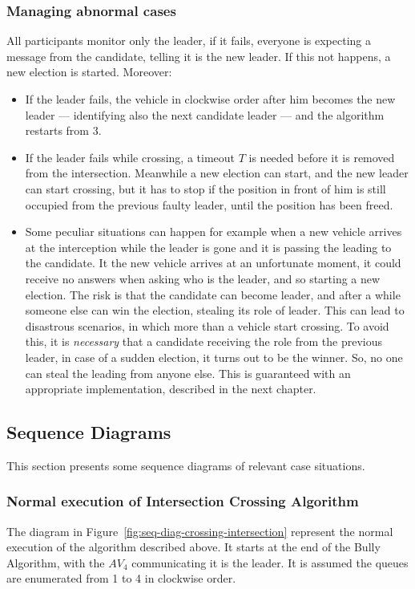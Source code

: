 \documentclass{memoir}
\begin{document}
\subsubsection{Managing abnormal cases}\label{subsec:abnormal-cases}

All participants monitor only the leader, if it fails, everyone is expecting a message from the candidate, telling it is the new leader. If this not happens, a new election is started. Moreover:

\begin{itemize}
	\item If the leader fails, the vehicle in clockwise order after him becomes the new leader --- identifying also the next candidate leader --- and the algorithm restarts from 3.
	\item If the leader fails while crossing, a timeout $T$ is needed before it is removed from the intersection. Meanwhile a new election can start, and the new leader can start crossing, but it has to stop if the position in front of him is still occupied from the previous faulty leader, until the position has been freed.
	\item Some peculiar situations can happen for example when a new vehicle arrives at the interception while the leader is gone and it is passing the leading to the candidate. It the new vehicle arrives at an unfortunate moment, it could receive no answers when asking who is the leader, and so starting a new election. The risk is that the candidate can become leader, and after a while someone else can win the election, stealing its role of leader. This can lead to disastrous scenarios, in which more than a vehicle start crossing. To avoid this, it is \emph{necessary} that a candidate receiving the role from the previous leader, in case of a sudden election, it turns out to be the winner. So, no one can steal the leading from anyone else. This is guaranteed with an appropriate implementation, described in the next chapter.
\end{itemize}

\subsection{Sequence Diagrams}
This section presents some sequence diagrams of relevant case situations.

\subsubsection{Normal execution of Intersection Crossing Algorithm}
The diagram in Figure~\ref{fig:seq-diag-crossing-intersection} represent the normal execution of the algorithm described above. It starts at the end of the Bully Algorithm, with the $AV_4$ communicating it is the leader. It is assumed the queues are enumerated from 1 to 4 in clockwise order.
\end{document}
